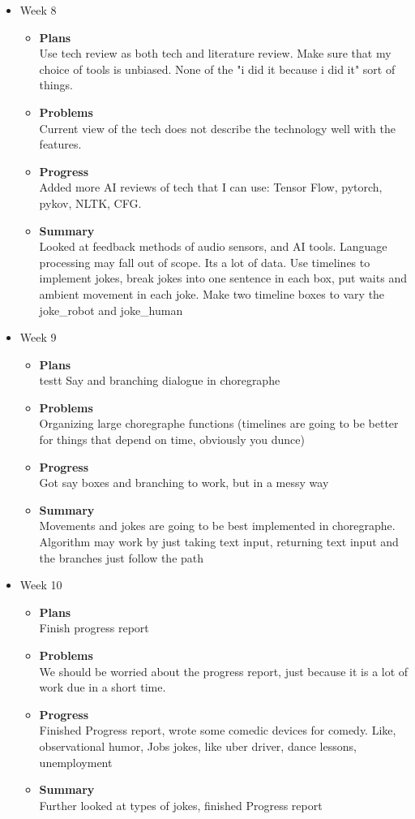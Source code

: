 \begin{itemize}
		\item{Week 8}
   			\begin{itemize}
				\item \textbf{Plans} \\
				Use tech review as both tech and literature review. Make sure that my choice of tools is unbiased. None of the "i did it because i did it" sort of things.
				\item \textbf{Problems} \\
				Current view of the tech does not describe the technology well with the features.
				\item \textbf{Progress} \\
				Added more AI reviews of tech that I can use:
				Tensor Flow, pytorch, pykov, NLTK, CFG.
				\item \textbf{Summary} \\
				Looked at feedback methods of audio sensors, and AI tools. Language processing may fall out of scope. Its a lot of data.
				Use timelines to implement jokes, break jokes into one sentence in each box, put waits and ambient movement in each joke. Make two timeline boxes to vary the joke\_robot and joke\_human 
			\end{itemize}
		\item{Week 9}
			\begin{itemize}
				\item \textbf{Plans} \\
			testt Say and branching dialogue in choregraphe 
				\item \textbf{Problems} \\
					Organizing large choregraphe functions (timelines are going to be better for things that depend on time, obviously you dunce) 			
				\item \textbf{Progress} \\
			Got say boxes and branching to work, but in a messy way	
				\item \textbf{Summary} \\
				Movements and jokes are going to be best implemented in choregraphe. Algorithm may work by just taking text input, returning text input and the branches just follow the path
			\end{itemize}
		\item{Week 10}
				\begin{itemize}
				\item \textbf{Plans} \\
				Finish progress report
				\item \textbf{Problems} \\
				We should be worried about the progress report, just because it is a lot of work due in a short time.
				\item \textbf{Progress} \\
				Finished Progress report, wrote some comedic devices for comedy. Like, observational humor, Jobs jokes, like uber driver, dance lessons, unemployment
				\item \textbf{Summary} \\
				Further looked at types of jokes, finished Progress report
			\end{itemize}
	\end{itemize}
